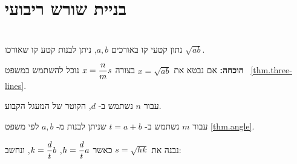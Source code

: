 %


\section{בניית שורש ריבועי}\label{s.root}

\begin{theorem}\label{thm.root}\mbox{}\\
נתון קטעי קו באורכים
$a,b$,
ניתן לבנות קטע קו שאורכו
$\sqrt{ab}$.
\end{theorem}

\textbf{הוכחה:}
אם נבטא את
$x=\sqrt{ab}$
בצורה
$x=\displaystyle\frac{n}{m}s$
נוכל להשתמש במשפט~%
\ref{thm.three-lines}.

עבור
$n$
נשתמש ב-%
$d$,
הקוטר של המעגל הקבוע.

עבור
$m$
נשתמש ב-%
$t=a+b$
שניתן לבנות מ-%
$a,b$
לפי משפט
\ref{thm.angle}.

נבנה את
$s=\sqrt{hk}$
כאשר
$h=\displaystyle\frac{d}{t}a$, $k=\displaystyle\frac{d}{t}b$,
ונחשב:
%

